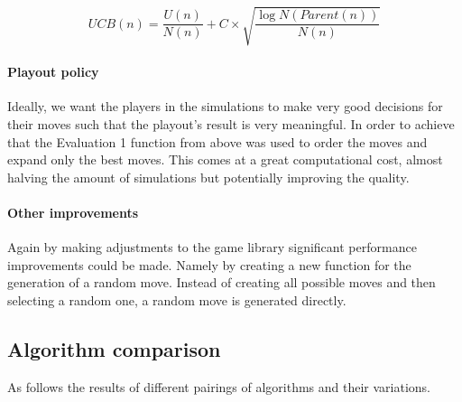\documentclass{llncs}
\begin{document}
$$
  UCB(n) = \frac{U(n)}{N(n)} + C \times \sqrt{\frac{\log{N(Parent(n))}}{N(n)}}
$$

\paragraph{Playout policy}
Ideally, we want the players in the simulations to make very good decisions for their moves such that the playout's result is very meaningful. In order to achieve that the Evaluation 1 function from above was used to order the moves and expand only the best moves. This comes at a great computational cost, almost halving the amount of simulations but potentially improving the quality.

\paragraph{Other improvements}
Again by making adjustments to the game library significant performance improvements could be made. Namely by creating a new function for the generation of a random move. Instead of creating all possible moves and then selecting a random one, a random move is generated directly.

\subsection{Algorithm comparison}
As follows the results of different pairings of algorithms and their variations.
\end{document}
